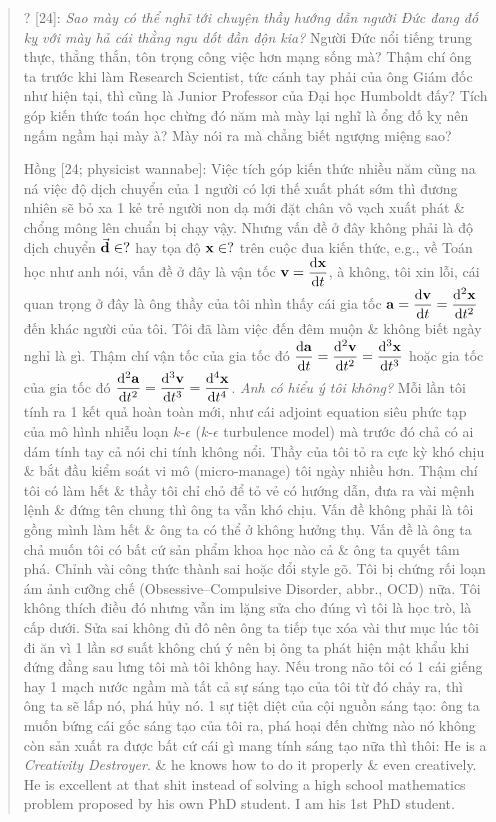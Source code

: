 \documentclass[12pt,twoside]{book}
\begin{document}
\begin{quote}
	{\sf ? [24]}: {\it Sao mày có thể nghĩ tới chuyện thầy hướng dẫn người Đức đang đố kỵ với mày hả cái thằng ngu dốt đần độn kia?} Người Đức nổi tiếng trung thực, thẳng thắn, tôn trọng công việc hơn mạng sống mà? Thậm chí ông ta trước khi làm Research Scientist, tức cánh tay phải của ông Giám đốc như hiện tại, thì cũng là Junior Professor của Đại học Humboldt đấy? Tích góp kiến thức toán học chừng đó năm mà mày lại nghĩ là ổng đố kỵ nên ngấm ngầm hại mày à? Mày nói ra mà chẳng biết ngượng miệng sao?
	
	{\sf Hồng [24; physicist wannabe]}: Việc tích góp kiến thức nhiều năm cũng na ná việc độ dịch chuyển của 1 người có lợi thế xuất phát sớm thì đương nhiên sẽ bỏ xa 1 kẻ trẻ người non dạ mới đặt chân vô vạch xuất phát \& chổng mông lên chuẩn bị chạy vậy. Nhưng vấn đề ở đây không phải là độ dịch chuyển $\vec{\bf d}\in?$ hay tọa độ ${\bf x}\in?$ trên cuộc đua kiến thức, e.g., về Toán học như anh nói, vấn đề ở đây là vận tốc ${\bf v} = \dfrac{{\rm d}{\bf x}}{{\rm d}t}$, à không, tôi xin lỗi, cái quan trọng ở đây là ông thầy của tôi nhìn thấy cái gia tốc ${\bf a} = \dfrac{{\rm d}{\bf v}}{{\rm d}t} = \dfrac{{\rm d}^2{\bf x}}{{\rm d}t^2}$ đến khác người của tôi. Tôi đã làm việc đến đêm muộn \& không biết ngày nghỉ là gì. Thậm chí vận tốc của gia tốc đó $\dfrac{{\rm d}{\bf a}}{{\rm d}t} = \dfrac{{\rm d}^2{\bf v}}{{\rm d}t^2} = \dfrac{{\rm d}^3{\bf x}}{{\rm d}t^3}$ hoặc gia tốc của gia tốc đó $\dfrac{{\rm d}^2{\bf a}}{{\rm d}t^2} = \dfrac{{\rm d}^3{\bf v}}{{\rm d}t^3} = \dfrac{{\rm d}^4{\bf x}}{{\rm d}t^4}$. {\it Anh có hiểu ý tôi không?} Mỗi lần tôi tính ra 1 kết quả hoàn toàn mới, như cái adjoint equation siêu phức tạp của mô hình nhiễu loạn $k$-$\epsilon$ ($k$-$\epsilon$ turbulence model) mà trước đó chả có ai dám tính tay cả nói chi tính không nổi. Thầy của tôi tỏ ra cực kỳ khó chịu \& bắt đầu kiểm soát vi mô (micro-manage) tôi ngày nhiều hơn. Thậm chí tôi có làm hết \& thầy tôi chỉ chỏ để tỏ vẻ có hướng dẫn, đưa ra vài mệnh lệnh \& đứng tên chung thì ông ta vẫn khó chịu. Vấn đề không phải là tôi gồng mình làm hết \& ông ta có thể ở không hưởng thụ. Vấn đề là ông ta chả muốn tôi có bất cứ sản phẩm khoa học nào cả \& ông ta quyết tâm phá. Chỉnh vài công thức thành sai hoặc đổi style gõ. Tôi bị chứng rối loạn ám ảnh cưỡng chế (Obsessive--Compulsive Disorder, abbr., OCD) nữa. Tôi không thích điều đó nhưng vẫn im lặng sửa cho đúng vì tôi là học trò, là cấp dưới. Sửa sai không đủ đô nên ông ta tiếp tục xóa vài thư mục lúc tôi đi ăn vì 1 lần sơ suất không chú ý nên bị ông ta phát hiện mật khẩu khi đứng đằng sau lưng tôi mà tôi không hay. Nếu trong não tôi có 1 cái giếng hay 1 mạch nước ngầm mà tất cả sự sáng tạo của tôi từ đó chảy ra, thì ông ta sẽ lấp nó, phá hủy nó. 1 sự tiệt diệt của cội nguồn sáng tạo: ông ta muốn bứng cái gốc sáng tạo của tôi ra, phá hoại đến chừng nào nó không còn sản xuất ra được bất cứ cái gì mang tính sáng tạo nữa thì thôi: He is a {\it Creativity Destroyer}. \& he knows how to do it properly \& even creatively. He is excellent at that shit instead of solving a high school mathematics problem proposed by his own PhD student. I am his 1st PhD student.
\end{quote}
\end{document}
